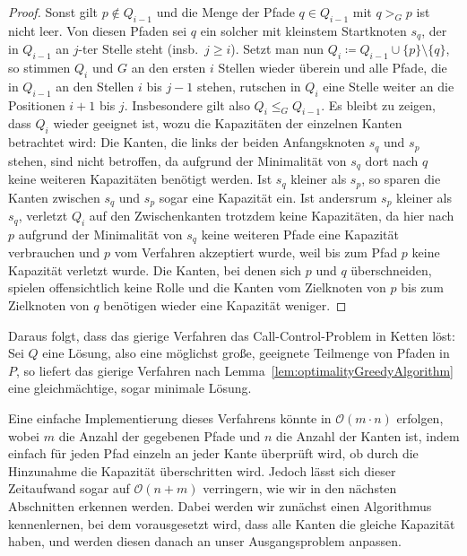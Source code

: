 \begin{proof}
    Sonst gilt $p \notin Q_{i-1}$ und die Menge der Pfade $q \in Q_{i-1}$ mit $q >_G p$ ist nicht leer.
    Von diesen Pfaden sei $q$ ein solcher mit kleinstem Startknoten $s_q$, der in $Q_{i-1}$ an $j$-ter Stelle steht
    (insb.\ $j \geq i$).
    Setzt man nun $Q_{i} \coloneqq Q_{i-1} \cup \{ p \} \setminus \{ q \} $, so stimmen $Q_{i}$ und $G$ an den
    ersten $i$ Stellen wieder überein und alle Pfade, die in $Q_{i-1}$ an den Stellen $i$ bis $j-1$ stehen, rutschen
    in $Q_i$ eine Stelle weiter an die Positionen $i+1$ bis $j$.
    Insbesondere gilt also $Q_i \leq_G Q_{i-1}$.
    Es bleibt zu zeigen, dass $Q_i$ wieder geeignet ist, wozu die Kapazitäten der einzelnen Kanten betrachtet wird:
    Die Kanten, die links der beiden Anfangsknoten $s_q$ und $s_p$ stehen, sind nicht betroffen, da aufgrund der Minimalität
    von $s_q$ dort nach $q$ keine weiteren Kapazitäten benötigt werden.
    Ist $s_q$ kleiner als $s_p$, so sparen die Kanten zwischen $s_q$ und $s_p$ sogar eine Kapazität ein.
    Ist andersrum $s_p$ kleiner als $s_q$, verletzt $Q_i$ auf den Zwischenkanten trotzdem keine Kapazitäten, da
    hier nach $p$ aufgrund der Minimalität von $s_q$ keine weiteren Pfade eine Kapazität verbrauchen und $p$ vom
    Verfahren akzeptiert wurde, weil bis zum Pfad $p$ keine Kapazität verletzt wurde.
    Die Kanten, bei denen sich $p$ und $q$ überschneiden, spielen offensichtlich keine Rolle und die Kanten
    vom Zielknoten von $p$ bis zum Zielknoten von $q$ benötigen wieder eine Kapazität weniger.
\end{proof}

Daraus folgt, dass das gierige Verfahren das Call-Control-Problem in Ketten löst:
Sei $Q$ eine Lösung, also eine möglichst große, geeignete Teilmenge von Pfaden in $P$, so liefert das gierige
Verfahren nach Lemma~\ref{lem:optimalityGreedyAlgorithm} eine gleichmächtige, sogar minimale Lösung.

Eine einfache Implementierung dieses Verfahrens könnte in $\mathcal O(m \cdot n)$ erfolgen, wobei $m$ die Anzahl der gegebenen
Pfade und $n$ die Anzahl der Kanten ist, indem einfach für jeden Pfad einzeln an jeder Kante überprüft wird, ob durch
die Hinzunahme die Kapazität überschritten wird.
Jedoch lässt sich dieser Zeitaufwand sogar auf $\mathcal O(n+m)$ verringern, wie wir in den nächsten Abschnitten erkennen werden.
Dabei werden wir zunächst einen Algorithmus kennenlernen, bei dem vorausgesetzt wird, dass alle Kanten die gleiche
Kapazität haben, und werden diesen danach an unser Ausgangsproblem anpassen.

